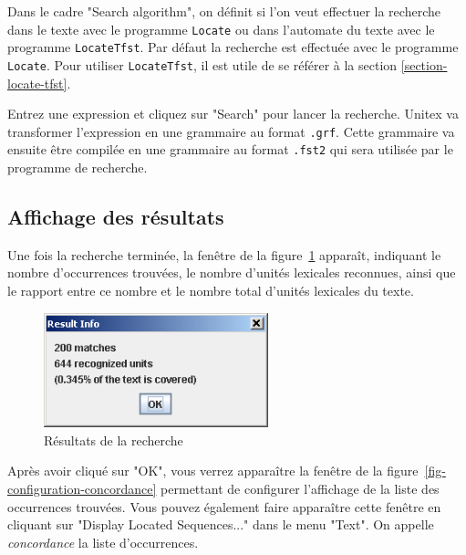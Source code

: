 \bigskip
\noindent Dans le cadre "Search algorithm", on définit si l'on veut effectuer la recherche dans le
texte avec le programme \verb+Locate+ ou dans l'automate du texte avec le programme \verb+LocateTfst+.
Par défaut la recherche est effectuée avec le programme \verb+Locate+. Pour utiliser
\verb+LocateTfst+, il est utile de se référer à la section \ref{section-locate-tfst}.

\bigskip
\noindent Entrez une expression et cliquez sur "Search" pour lancer la recherche. Unitex va transformer
l’expression en une grammaire au format \verb+.grf+.
 Cette grammaire va ensuite être compilée en une grammaire au format
\verb+.fst2+ qui sera utilisée par le programme de recherche.


\subsection{Affichage des résultats}
\label{section-display-occurrences}
Une fois la recherche terminée, la fenêtre de la figure~\ref{fig-search-results}
apparaît, indiquant le nombre d’occurrences trouvées, le nombre d’unités lexicales reconnues,
ainsi que le rapport entre ce nombre et le nombre total d’unités lexicales du texte.

\bigskip
\begin{figure}[h]
\begin{center}
\includegraphics[width=6.5cm]{resources/img/fig4-5.png}
\caption{Résultats de la recherche \label{fig-search-results}}
\end{center}
\end{figure}

\noindent Après avoir cliqué sur "OK", vous verrez apparaître la fenêtre de la
figure~\ref{fig-configuration-concordance} permettant de configurer l’affichage de la liste
des occurrences trouvées. Vous pouvez également faire apparaître cette fenêtre en cliquant sur
"Display Located Sequences..." dans le menu "Text".
On appelle \textit{concordance} la liste d’occurrences.


